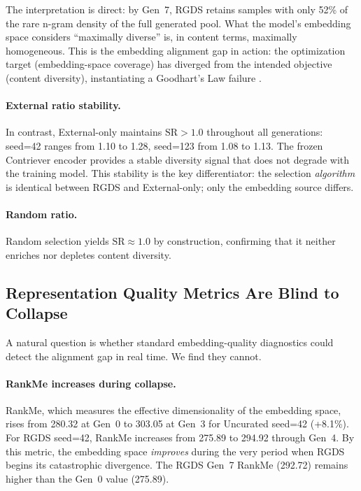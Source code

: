 The interpretation is direct: by Gen~7, RGDS retains samples with only 52\% of the rare n-gram density of the full generated pool. What the model's embedding space considers ``maximally diverse'' is, in content terms, maximally homogeneous. This is the embedding alignment gap in action: the optimization target (embedding-space coverage) has diverged from the intended objective (content diversity), instantiating a Goodhart's Law failure \citep{goodhart1984problems}.

\paragraph{External ratio stability.} In contrast, External-only maintains $\text{SR} > 1.0$ throughout all generations: seed=42 ranges from 1.10 to 1.28, seed=123 from 1.08 to 1.13. The frozen Contriever encoder provides a stable diversity signal that does not degrade with the training model. This stability is the key differentiator: the selection \textit{algorithm} is identical between RGDS and External-only; only the embedding source differs.

\paragraph{Random ratio.} Random selection yields $\text{SR} \approx 1.0$ by construction, confirming that it neither enriches nor depletes content diversity.

\subsection{Representation Quality Metrics Are Blind to Collapse}
\label{sec:blind_metrics}

A natural question is whether standard embedding-quality diagnostics could detect the alignment gap in real time. We find they cannot.

\paragraph{RankMe increases during collapse.} RankMe, which measures the effective dimensionality of the embedding space, rises from 280.32 at Gen~0 to 303.05 at Gen~3 for Uncurated seed=42 (+8.1\%). For RGDS seed=42, RankMe increases from 275.89 to 294.92 through Gen~4. By this metric, the embedding space \textit{improves} during the very period when RGDS begins its catastrophic divergence. The RGDS Gen~7 RankMe (292.72) remains higher than the Gen~0 value (275.89).

